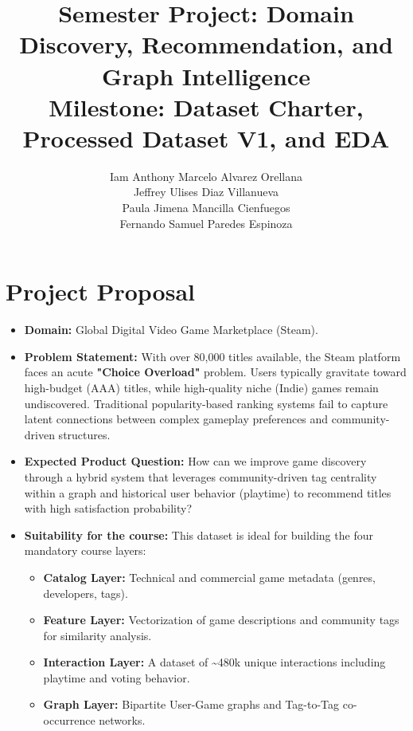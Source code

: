 \documentclass[11pt,a4paper]{article}
\title{Semester Project: Domain Discovery, Recommendation, and Graph Intelligence\\
\large Milestone: Dataset Charter, Processed Dataset V1, and EDA}
\author{Iam Anthony Marcelo Alvarez Orellana \\ Jeffrey Ulises Diaz Villanueva \\ Paula Jimena Mancilla Cienfuegos \\ Fernando Samuel Paredes Espinoza}
\date{}
\begin{document}
\maketitle
\onehalfspacing


\section{Project Proposal}
\begin{itemize}[leftmargin=*]
  \item \textbf{Domain:} Global Digital Video Game Marketplace (Steam).
  \item \textbf{Problem Statement:} With over 80,000 titles available, the Steam platform faces an acute \textbf{"Choice Overload"} problem. Users typically gravitate toward high-budget (AAA) titles, while high-quality niche (Indie) games remain undiscovered. Traditional popularity-based ranking systems fail to capture latent connections between complex gameplay preferences and community-driven structures.
  \item \textbf{Expected Product Question:} How can we improve game discovery through a hybrid system that leverages community-driven tag centrality within a graph and historical user behavior (playtime) to recommend titles with high satisfaction probability?
  \item \textbf{Suitability for the course:} This dataset is ideal for building the four mandatory course layers:
  \begin{itemize}[leftmargin=*]
    \item \textbf{Catalog Layer:} Technical and commercial game metadata (genres, developers, tags).
    \item \textbf{Feature Layer:} Vectorization of game descriptions and community tags for similarity analysis.
    \item \textbf{Interaction Layer:} A dataset of \textasciitilde 480k unique interactions including playtime and voting behavior.
    \item \textbf{Graph Layer:} Bipartite User-Game graphs and Tag-to-Tag co-occurrence networks.
  \end{itemize}
\end{itemize}
\end{document}
